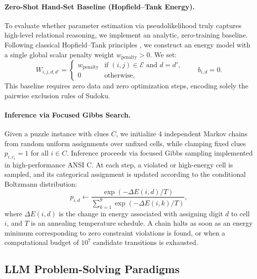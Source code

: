 \documentclass{article} %
\begin{document}
\paragraph{Zero-Shot Hand-Set Baseline (Hopfield--Tank Energy).}
To evaluate whether parameter estimation via pseudolikelihood truly captures high-level relational reasoning, we implement an analytic, zero-training baseline. Following classical Hopfield--Tank principles \citep{hopfield1985neural}, we construct an energy model with a single global scalar penalty weight $w_{\mathrm{penalty}} > 0$. We set:
\begin{equation}
    W_{i, j, d, d'} = 
    \begin{cases} 
        w_{\mathrm{penalty}} & \text{if } (i, j) \in \mathcal{E} \text{ and } d = d', \\
        0 & \text{otherwise},
    \end{cases}
    \qquad b_{i, d} = 0.
\end{equation}
This baseline requires zero data and zero optimization steps, encoding solely the pairwise exclusion rules of Sudoku.

\paragraph{Inference via Focused Gibbs Search.}
Given a puzzle instance with clues $C$, we initialize 4 independent Markov chains from random uniform assignments over unfixed cells, while clamping fixed clues $p_{i, c_i} = 1$ for all $i \in C$. Inference proceeds via focused Gibbs sampling implemented in high-performance ANSI C. At each step, a violated or high-energy cell is sampled, and its categorical assignment is updated according to the conditional Boltzmann distribution:
\begin{equation}
    p_{i, d} \leftarrow \frac{\exp(-\Delta E(i, d) / T)}{\sum_{k=1}^9 \exp(-\Delta E(i, k) / T)},
\end{equation}
where $\Delta E(i, d)$ is the change in energy associated with assigning digit $d$ to cell $i$, and $T$ is an annealing temperature schedule. A chain halts as soon as an energy minimum corresponding to zero constraint violations is found, or when a computational budget of $10^7$ candidate transitions is exhausted.

\subsection{LLM Problem-Solving Paradigms}
\end{document}
